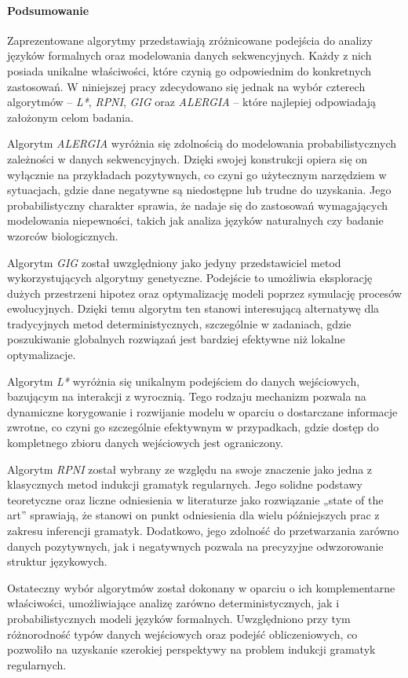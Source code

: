 \paragraph*{Podsumowanie}  
Zaprezentowane algorytmy przedstawiają zróżnicowane podejścia do analizy języków formalnych oraz modelowania danych sekwencyjnych. Każdy z nich posiada unikalne właściwości, które czynią go odpowiednim do konkretnych zastosowań. W niniejszej pracy zdecydowano się jednak na wybór czterech algorytmów -- \textit{L*}, \textit{RPNI}, \textit{GIG} oraz \textit{ALERGIA} -- które najlepiej odpowiadają założonym celom badania.  

Algorytm \textit{ALERGIA} wyróżnia się zdolnością do modelowania probabilistycznych zależności w danych sekwencyjnych. Dzięki swojej konstrukcji opiera się on wyłącznie na przykładach pozytywnych, co czyni go użytecznym narzędziem w sytuacjach, gdzie dane negatywne są niedostępne lub trudne do uzyskania. Jego probabilistyczny charakter sprawia, że nadaje się do zastosowań wymagających modelowania niepewności, takich jak analiza języków naturalnych czy badanie wzorców biologicznych.  

Algorytm \textit{GIG} został uwzględniony jako jedyny przedstawiciel metod wykorzystujących algorytmy genetyczne. Podejście to umożliwia eksplorację dużych przestrzeni hipotez oraz optymalizację modeli poprzez symulację procesów ewolucyjnych. Dzięki temu algorytm ten stanowi interesującą alternatywę dla tradycyjnych metod deterministycznych, szczególnie w zadaniach, gdzie poszukiwanie globalnych rozwiązań jest bardziej efektywne niż lokalne optymalizacje.  

Algorytm \textit{L*} wyróżnia się unikalnym podejściem do danych wejściowych, bazującym na interakcji z wyrocznią. Tego rodzaju mechanizm pozwala na dynamiczne korygowanie i rozwijanie modelu w oparciu o dostarczane informacje zwrotne, co czyni go szczególnie efektywnym w przypadkach, gdzie dostęp do kompletnego zbioru danych wejściowych jest ograniczony.  

Algorytm \textit{RPNI} został wybrany ze względu na swoje znaczenie jako jedna z klasycznych metod indukcji gramatyk regularnych. Jego solidne podstawy teoretyczne oraz liczne odniesienia w literaturze jako rozwiązanie „state of the art” sprawiają, że stanowi on punkt odniesienia dla wielu późniejszych prac z zakresu inferencji gramatyk. Dodatkowo, jego zdolność do przetwarzania zarówno danych pozytywnych, jak i negatywnych pozwala na precyzyjne odwzorowanie struktur językowych.  

Ostateczny wybór algorytmów został dokonany w oparciu o ich komplementarne właściwości, umożliwiające analizę zarówno deterministycznych, jak i probabilistycznych modeli języków formalnych. Uwzględniono przy tym różnorodność typów danych wejściowych oraz podejść obliczeniowych, co pozwoliło na uzyskanie szerokiej perspektywy na problem indukcji gramatyk regularnych.  

